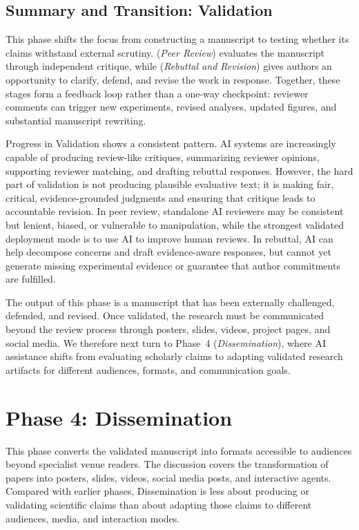 \documentclass{llmxive}
\providecommand{\levelbadge}[2]{  \tcbox[on line, nobeforeafter, tcbox raise base,
         boxsep=0pt, left=2pt, right=2pt, top=0.5pt, bottom=0.5pt,
         arc=1.5pt, boxrule=0.3pt,
         colback=#1!15, colframe=#1!70]    {\scriptsize\bfseries\sffamily#2}}
\providecommand{\Ssix}{\texorpdfstring{\levelbadge{S6color}{S6}}{S6}\xspace}
\providecommand{\Sseven}{\texorpdfstring{\levelbadge{S7color}{S7}}{S7}\xspace}
\begin{document}
\subsection{Summary and Transition: Validation}

\label{sec:validation_summary}

This phase shifts the focus from constructing a manuscript to testing whether its claims withstand external scrutiny. \Ssix (\emph{Peer Review}) evaluates the manuscript through independent critique, while \Sseven (\emph{Rebuttal and Revision}) gives authors an opportunity to clarify, defend, and revise the work in response. Together, these stages form a feedback loop rather than a one-way checkpoint: reviewer comments can trigger new experiments, revised analyses, updated figures, and substantial manuscript rewriting.

Progress in Validation shows a consistent pattern. AI systems are increasingly capable of producing review-like critiques, summarizing reviewer opinions, supporting reviewer matching, and drafting rebuttal responses. However, the hard part of validation is not producing plausible evaluative text; it is making fair, critical, evidence-grounded judgments and ensuring that critique leads to accountable revision. In peer review, standalone AI reviewers may be consistent but lenient, biased, or vulnerable to manipulation, while the strongest validated deployment mode is to use AI to improve human reviews. In rebuttal, AI can help decompose concerns and draft evidence-aware responses, but cannot yet generate missing experimental evidence or guarantee that author commitments are fulfilled.

The output of this phase is a manuscript that has been externally challenged, defended, and revised. Once validated, the research must be communicated beyond the review process through posters, slides, videos, project pages, and social media. We therefore next turn to Phase~4 (\emph{Dissemination}), where AI assistance shifts from evaluating scholarly claims to adapting validated research artifacts for different audiences, formats, and communication goals.
\section{Phase 4: Dissemination}
\label{sec:dissemination}

This phase converts the validated manuscript into formats accessible to audiences beyond specialist venue readers. The discussion covers the transformation of papers into posters, slides, videos, social media posts, and interactive agents. Compared with earlier phases, Dissemination is less about producing or validating scientific claims than about adapting those claims to different audiences, media, and interaction modes.
\end{document}
